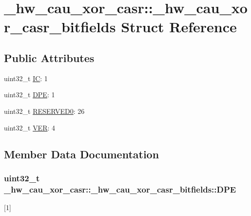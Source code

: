 \hypertarget{struct__hw__cau__xor__casr_1_1__hw__cau__xor__casr__bitfields}{}\section{\+\_\+hw\+\_\+cau\+\_\+xor\+\_\+casr\+:\+:\+\_\+hw\+\_\+cau\+\_\+xor\+\_\+casr\+\_\+bitfields Struct Reference}
\label{struct__hw__cau__xor__casr_1_1__hw__cau__xor__casr__bitfields}
\subsection*{Public Attributes}
\begin{DoxyCompactItemize}
\item 
uint32\+\_\+t \hyperlink{struct__hw__cau__xor__casr_1_1__hw__cau__xor__casr__bitfields_a72892ab9fab4ed61cd79bfe7de31dbc8}{IC}\+: 1
\item 
uint32\+\_\+t \hyperlink{struct__hw__cau__xor__casr_1_1__hw__cau__xor__casr__bitfields_a1bae4b150f57df512ffe388435169bdc}{D\+PE}\+: 1
\item 
uint32\+\_\+t \hyperlink{struct__hw__cau__xor__casr_1_1__hw__cau__xor__casr__bitfields_ad5e76b66f511a8bce71c5151aa484f57}{R\+E\+S\+E\+R\+V\+E\+D0}\+: 26
\item 
uint32\+\_\+t \hyperlink{struct__hw__cau__xor__casr_1_1__hw__cau__xor__casr__bitfields_a6086132fec6a812ecb65a4b0fd39f689}{V\+ER}\+: 4
\end{DoxyCompactItemize}


\subsection{Member Data Documentation}
\subsubsection[{\texorpdfstring{D\+PE}{DPE}}]{\setlength{\rightskip}{0pt plus 5cm}uint32\+\_\+t \+\_\+hw\+\_\+cau\+\_\+xor\+\_\+casr\+::\+\_\+hw\+\_\+cau\+\_\+xor\+\_\+casr\+\_\+bitfields\+::\+D\+PE}\hypertarget{struct__hw__cau__xor__casr_1_1__hw__cau__xor__casr__bitfields_a1bae4b150f57df512ffe388435169bdc}{}\label{struct__hw__cau__xor__casr_1_1__hw__cau__xor__casr__bitfields_a1bae4b150f57df512ffe388435169bdc}
\mbox{[}1\mbox{]} 
